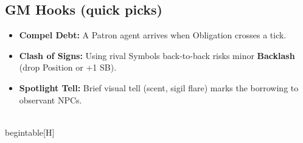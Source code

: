 \subsection*{GM Hooks (quick picks)}
\begin{itemize}
  \item \textbf{Compel Debt:} A Patron agent arrives when Obligation crosses a tick.
  \item \textbf{Clash of Signs:} Using rival Symbols back-to-back risks minor \textbf{Backlash} (drop Position or +1 SB).
  \item \textbf{Spotlight Tell:} Brief visual tell (scent, sigil flare) marks the borrowing to observant NPCs.
\end{itemize}

\\begin{table}[H]
\centering
\renewcommand{\arraystretch}{1.15}
